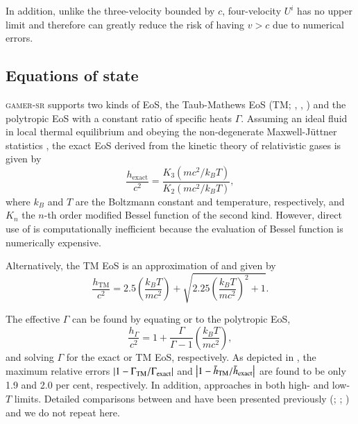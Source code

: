 \documentclass[twocolumn]{aastex63}
\begin{document}
In addition, unlike the three-velocity bounded by $c$, four-velocity $U^i$ has no upper limit and therefore can greatly reduce the risk of having $v>c$ due to numerical errors.

\subsection{Equations of state}
\label{EoS}
\textsc{gamer-sr} supports two kinds of EoS, the Taub-Mathews EoS (TM; \citealt{Taub}, \citealt{TM_EOS}, \citealt{Compare_TM_EOS}) and the polytropic EoS with a constant ratio of specific heats $\Gamma$. Assuming an ideal fluid in local thermal equilibrium and obeying the non-degenerate Maxwell-J\"{u}ttner statistics \citep{Juttner}, the exact EoS \citep{Synge} derived from the kinetic theory of relativistic gases is given by
\begin{equation}
    \frac{h_{\text{exact}}}{c^2}=
    \frac{K_{3}\left(mc^2/k_{B}T\right)}
         {K_{2}\left(mc^2/k_{B}T\right)},
\label{EXACT_EOS}
\end{equation}
where $k_{B}$ and $T$ are the Boltzmann constant and temperature, respectively, and $K_{n}$ the $n$-th order modified Bessel function of the second kind. However, direct use of  is computationally inefficient because the evaluation of Bessel function is numerically expensive.

Alternatively, the TM EoS is an approximation of  and given by
\begin{equation}
\frac{h_{\text{TM}}}{c^2}=2.5\left(\frac{k_B T}{mc^2}\right)+\sqrt{2.25{\left(\frac{k_B T}{mc^2}\right)}^{2}+1}.
\label{TM EOS}
\end{equation}

The effective $\Gamma$ can be found by equating  or  to the polytropic EoS,
\begin{equation}
    \frac{h_{\Gamma}}{c^2}=
    1+\frac{\Gamma}{\Gamma-1}\left(\frac{k_{B}T}{mc^2}\right),
\end{equation}
and solving $\Gamma$ for the exact or TM EoS, respectively. As depicted in , the maximum relative errors $\abs{1-\Gamma_{\text{TM}}/\Gamma_{\text{exact}}}$ and $\abs{1-\tilde{h}_{\text{TM}}/\tilde{h}_{\text{exact}}}$ are found to be only 1.9 and 2.0 per cent, respectively.  In addition,  approaches  in both high- and low-$T$ limits. Detailed comparisons between  and  have been presented previously (\citealt{Compare_TM_EOS}; \citealt{RC_EOS}; \citealt{NR_Limit}) and we do not repeat here.
\end{document}
